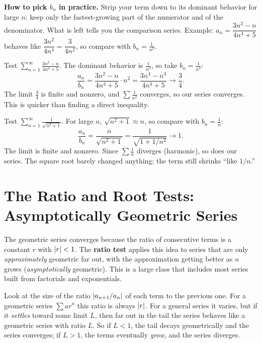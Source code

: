 \begin{focusbox}
\textbf{How to pick $b_n$ in practice.} Strip your term down to its dominant behavior for large $n$: keep only the fastest-growing part of the numerator and of the denominator. What is left tells you the comparison series. Example: $a_n = \dfrac{3n^2 - n}{4n^4 + 5}$ behaves like $\dfrac{3n^2}{4n^4} = \dfrac{3}{4n^2}$, so compare with $b_n = \tfrac{1}{n^2}$.
\end{focusbox}

\begin{example}
Test $\displaystyle\sum_{n=1}^\infty \frac{3n^2 - n}{4n^4 + 5}$. The dominant behavior is $\tfrac{1}{n^2}$, so take $b_n = \tfrac1{n^2}$:
\[
\frac{a_n}{b_n} = \frac{3n^2 - n}{4n^4 + 5}\cdot n^2 = \frac{3n^4 - n^3}{4n^4 + 5} \longrightarrow \frac{3}{4}.
\]
The limit $\tfrac34$ is finite and nonzero, and $\sum\tfrac1{n^2}$ converges, so our series converges. This is quicker than finding a direct inequality.
\end{example}

\begin{example}
Test $\displaystyle\sum_{n=1}^\infty \frac{1}{\sqrt{n^2+1}}$. For large $n$, $\sqrt{n^2+1}\approx n$, so compare with $b_n=\tfrac1n$:
\[
\frac{a_n}{b_n} = \frac{n}{\sqrt{n^2+1}} = \frac{1}{\sqrt{1+1/n^2}} \longrightarrow 1.
\]
The limit is finite and nonzero. Since $\sum\tfrac1n$ diverges (harmonic), so does our series. The square root barely changed anything; the term still shrinks ``like $1/n$.''
\end{example}

\section{The Ratio and Root Tests: Asymptotically Geometric Series}
\label{ch29:ratio-root}

The geometric series converges because the ratio of consecutive terms is a constant $r$ with $\lvert r\rvert < 1$. The \textbf{ratio test} applies this idea to series that are only \emph{approximately} geometric far out, with the approximation getting better as $n$ grows (\emph{asymptotically} geometric). This is a large class that includes most series built from factorials and exponentials.

\begin{intuitionbox}
Look at the size of the ratio $\lvert a_{n+1}/a_n\rvert$ of each term to the previous one. For a geometric series $\sum a r^n$ this ratio is always $\lvert r\rvert$. For a general series it varies, but if it \emph{settles} toward some limit $L$, then far out in the tail the series behaves like a geometric series with ratio $L$. So if $L<1$, the tail decays geometrically and the series converges; if $L>1$, the terms eventually \emph{grow}, and the series diverges.
\end{intuitionbox}

